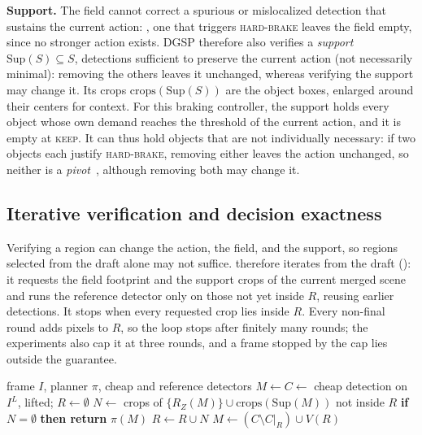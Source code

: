\documentclass[10pt,twocolumn,letterpaper]{article}
\newcommand{\method}{DGSP\xspace}
\newcommand{\draft}{C}            %
\newcommand{\merged}{M}           %
\newcommand{\Sup}{\mathrm{Sup}}   %
\newcommand{\field}{Z}            %
\newcommand{\foot}{R_{\field}}    %
\newcommand{\policy}{\pi}         %
\theoremstyle{definition}
\theoremstyle{remark}
\begin{document}
\noindent\textbf{Support.}
The field cannot correct a spurious or mislocalized detection that sustains the current action: \eg, one that triggers \textsc{hard-brake} leaves the field empty, since no stronger action exists.
\method therefore also verifies a \emph{support} $\Sup(S)\subseteq S$, detections sufficient to preserve the current action (not necessarily minimal): removing the others leaves it unchanged, whereas verifying the support may change it.
Its crops $\mathrm{crops}(\Sup(S))$ are the object boxes, enlarged around their centers for context.
For this braking controller, the support holds every object whose own demand reaches the threshold of the current action, and it is empty at \textsc{keep}.
It can thus hold objects that are not individually necessary: if two objects each justify \textsc{hard-brake}, removing either leaves the action unchanged, so neither is a \emph{pivot}~\cite{cfimportance}, although removing both may change it.

\subsection{Iterative verification and decision exactness}
\label{sec:loop}

Verifying a region can change the action, the field, and the support, so regions selected from the draft alone may not suffice.
 therefore iterates from the draft (): it requests the field footprint and the support crops of the current merged scene and runs the reference detector only on those not yet inside $R$, reusing earlier detections.
It stops when every requested crop lies inside $R$.
Every non-final round adds pixels to $R$, so the loop stops after finitely many rounds; the experiments also cap it at three rounds, and a frame stopped by the cap lies outside the guarantee.

\begin{algorithm}[t]
\caption{Decision-guided speculative perception}
\label{alg:loop}
\small
\begin{algorithmic}[1]
\Require frame $I$, planner $\policy$, cheap and reference detectors
\State $\merged \gets \draft \gets$ cheap detection on $I^L$, lifted;\; $R \gets \emptyset$
\Loop
  \State $N \gets$ crops of $\{\foot(\merged)\}\cup\mathrm{crops}(\Sup(\merged))$ not inside $R$
  \State \textbf{if} $N=\emptyset$ \textbf{then return} $\policy(\merged)$
  \State $R \gets R\cup N$ 
  \State $\merged \gets (\draft\setminus\draft|_R)\cup V(R)$ 
\EndLoop
\end{algorithmic}
\end{algorithm}
\end{document}
